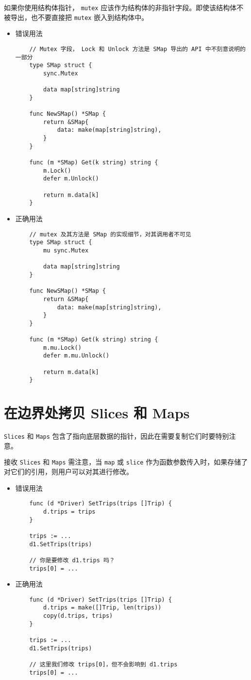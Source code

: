 如果你使用结构体指针， \texttt{mutex} 应该作为结构体的非指针字段。即使该结构体不被导出，也不要直接把 \texttt{mutex} 嵌入到结构体中。
\begin{itemize}[leftmargin=4em]
\item 错误用法

  \begin{verbatim}
    // Mutex 字段， Lock 和 Unlock 方法是 SMap 导出的 API 中不刻意说明的一部分
    type SMap struct {
    	sync.Mutex

    	data map[string]string
    }

    func NewSMap() *SMap {
    	return &SMap{
    		data: make(map[string]string),
    	}
    }

    func (m *SMap) Get(k string) string {
    	m.Lock()
    	defer m.Unlock()

    	return m.data[k]
    }
  \end{verbatim}
\item 正确用法

  \begin{verbatim}
    // mutex 及其方法是 SMap 的实现细节，对其调用者不可见
    type SMap struct {
    	mu sync.Mutex

    	data map[string]string
    }

    func NewSMap() *SMap {
    	return &SMap{
    		data: make(map[string]string),
    	}
    }

    func (m *SMap) Get(k string) string {
    	m.mu.Lock()
    	defer m.mu.Unlock()

    	return m.data[k]
    }
  \end{verbatim}
\end{itemize}

\section{在边界处拷贝 Slices 和 Maps}
\texttt{Slices} 和 \texttt{Maps} 包含了指向底层数据的指针，因此在需要复制它们时要特别注意。

接收 \texttt{Slices} 和 \texttt{Maps} 需注意，当 \texttt{map} 或 \texttt{slice} 作为函数参数传入时，如果存储了对它们的引用，则用户可以对其进行修改。
\begin{itemize}[leftmargin=4em]
\item 错误用法

  \begin{verbatim}
    func (d *Driver) SetTrips(trips []Trip) {
    	d.trips = trips
    }

    trips := ...
    d1.SetTrips(trips)

    // 你是要修改 d1.trips 吗？
    trips[0] = ...
  \end{verbatim}
\item 正确用法

  \begin{verbatim}
    func (d *Driver) SetTrips(trips []Trip) {
    	d.trips = make([]Trip, len(trips))
    	copy(d.trips, trips)
    }

    trips := ...
    d1.SetTrips(trips)

    // 这里我们修改 trips[0]，但不会影响到 d1.trips
    trips[0] = ...
  \end{verbatim}
\end{itemize}

